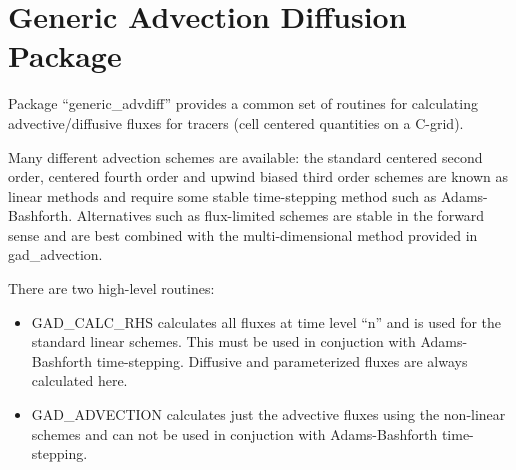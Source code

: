 
\section{Generic Advection Diffusion Package}
  
Package ``generic\_advdiff'' provides a common set of routines for
calculating advective/diffusive fluxes for tracers (cell centered
quantities on a C-grid).
  
Many different advection schemes are available: the standard centered
second order, centered fourth order and upwind biased third order
schemes are known as linear methods and require some stable
time-stepping method such as Adams-Bashforth. Alternatives such as
flux-limited schemes are stable in the forward sense and are best
combined with the multi-dimensional method provided in gad\_advection.
  
There are two high-level routines:
\begin{itemize}
\item{GAD\_CALC\_RHS} calculates all fluxes at time level ``n'' and is
  used for the standard linear schemes. This must be used in
  conjuction with Adams-Bashforth time-stepping. Diffusive and
  parameterized fluxes are always calculated here.
  
\item{GAD\_ADVECTION} calculates just the advective fluxes using the
  non-linear schemes and can not be used in conjuction with
  Adams-Bashforth time-stepping.
\end{itemize} 

\newpage

